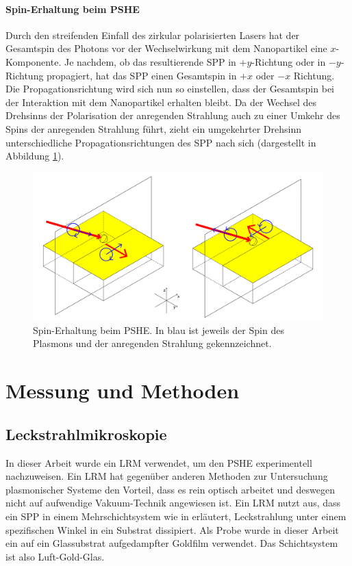 \documentclass[titlepage]{article}
\begin{document}
	\paragraph{Spin-Erhaltung beim PSHE}
	Durch den streifenden Einfall des zirkular polarisierten Lasers hat der Gesamtspin des Photons vor der Wechselwirkung mit dem Nanopartikel eine $x$-Komponente. Je nachdem, ob das resultierende SPP in $+y$-Richtung oder in $-y$-Richtung propagiert, hat das SPP einen Gesamtspin in  $+x$ oder $-x$ Richtung. Die Propagationsrichtung wird sich nun so einstellen, dass der Gesamtspin bei der Interaktion mit dem Nanopartikel erhalten bleibt. Da der Wechsel des Drehsinns der Polarisation der anregenden Strahlung auch zu einer Umkehr des Spins der anregenden Strahlung führt, zieht ein umgekehrter Drehsinn unterschiedliche Propagationsrichtungen des SPP nach sich (dargestellt in Abbildung \ref{fig:spin_hall_schema}).
	\begin{figure}[h]
		\centering
		\includegraphics[width=1.0\linewidth]{figures/spin_hall_schema.pdf}
		\caption[Spin-Erhaltung PSHE]{Spin-Erhaltung beim PSHE. In blau ist jeweils der Spin des Plasmons und der anregenden Strahlung gekennzeichnet.}
		\label{fig:spin_hall_schema}
	\end{figure}
	
	
	
	\section{Messung und Methoden}
	\subsection{Leckstrahlmikroskopie}
	In dieser Arbeit wurde ein LRM verwendet, um den PSHE experimentell nachzuweisen. Ein LRM hat gegenüber anderen Methoden zur Untersuchung plasmonischer Systeme den Vorteil, dass es rein optisch arbeitet und deswegen nicht auf aufwendige Vakuum-Technik angewiesen ist. Ein LRM nutzt aus, dass ein SPP in einem Mehrschichtsystem wie in  erläutert, Leckstrahlung unter einem spezifischen Winkel in ein Substrat dissipiert. Als Probe wurde in dieser Arbeit ein auf ein Glassubstrat aufgedampfter Goldfilm verwendet. Das Schichtsystem ist also Luft-Gold-Glas.
	
\end{document}
